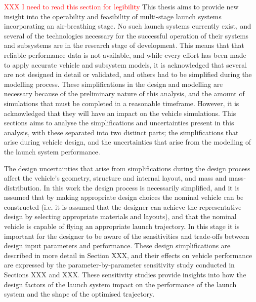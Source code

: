 \textcolor{red}{XXX I need to read this section for legibility}
This thesis aims to provide new insight into the operability and feasibility of multi-stage launch systems incorporating an air-breathing stage.
No such launch systems currently exist, and several of the technologies necessary for the successful operation of their systems and subsystems are in the research stage of development.
This means that that reliable performance data is not available, and while every effort has been made to apply accurate vehicle and subsystem models, it is acknowledged that several are not designed in detail or validated, and others had to be simplified during the modelling process. These simplifications in the design and modelling are necessary because of the preliminary nature of this analysis, and the amount of simulations that must be completed in a reasonable timeframe. However, it is acknowledged that they will have an impact on the vehicle simulations. 
This sections aims to analyse the simplifications and uncertainties present in this analysis, with these separated into two distinct parts; the simplifications that arise during vehicle design, and the uncertainties that arise from the modelling of the launch system performance. 

The design uncertainties that arise from simplifications during the design process affect the vehicle's geometry, structure and internal layout, and mass and mass-distribution. In this work the design process is necessarily simplified, and it is assumed that by making appropriate design choices the nominal vehicle can be constructed (i.e. it is assumed that the designer can achieve the representative design by selecting appropriate materials and layouts), and that the nominal vehicle is capable of flying an appropriate launch trajectory. In this stage it is important for the designer to be aware of the sensitivities and trade-offs between design input parameters and performance. These design simplifications are described in more detail in Section XXX, and their effects on vehicle performance are expressed by the parameter-by-parameter sensitivity study conducted in Sections XXX and XXX. These sensitivity studies provide insights into how the design factors of the launch system impact on the performance of the launch system and the shape of the optimised trajectory.


